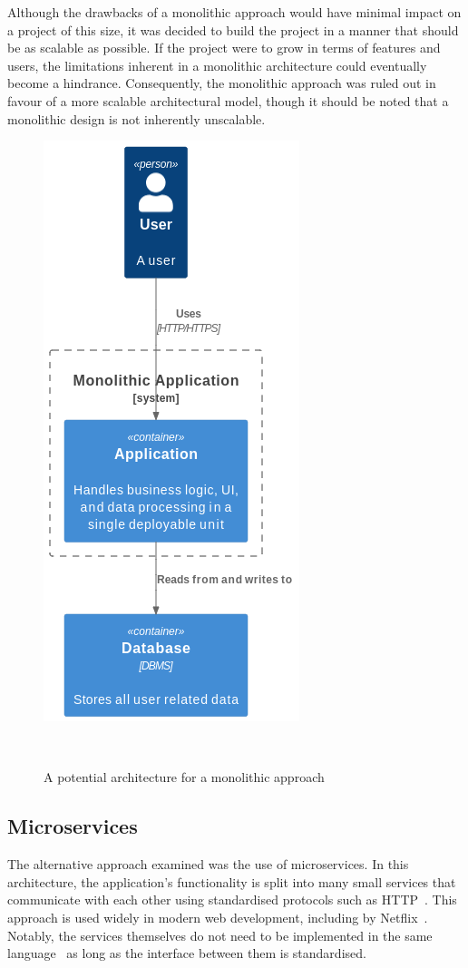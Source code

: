 Although the drawbacks of a monolithic approach would have minimal impact on a project of this size, it was decided to build the project in a manner that should be as scalable as possible. If the project were to grow in terms of features and users, the limitations inherent in a monolithic architecture could eventually become a hindrance. Consequently, the monolithic approach was ruled out in favour of a more scalable architectural model, though it should be noted that a monolithic design is not inherently unscalable.

\begin{figure} [H]
    \centering
    \includegraphics[width=0.35\linewidth]{figures/monolithic_arch.png}
    \caption{A potential architecture for a monolithic approach}
~\label{fig:monolith-arch}
\end{figure}

\subsection{Microservices}
The alternative approach examined was the use of microservices. In this architecture, the application's functionality is split into many small services that communicate with each other using standardised protocols such as HTTP~\cite{8354423}. This approach is used widely in modern web development, including by Netflix~\cite{NetflixMicroservices}. Notably, the services themselves do not need to be implemented in the same language~\cite{7030212} as long as the interface between them is standardised.


